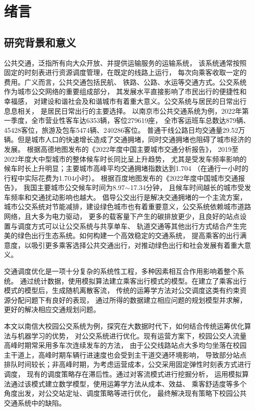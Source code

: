 \section{绪言}
\subsection{研究背景和意义}
公共交通，泛指所有向大众开放、并提供运输服务的运输系统，
该系统通常按照固定的时刻表进行资源调度管理，在既定的线路上运行，
每次向乘客收取一定的费用。广义而言，公共交通包括民航、
铁路、公路、水运等交通方式。公交系统作为城市公交网络的重要组成部分，
其发展水平直接影响了市民出行的便捷性和幸福感，
对建设和谐社会及和谐城市有着重大意义。公交系统与居民的日常出行息息相关，
是居民日常出行的主要选择。
以南京市公共交通系统为例，2022年第一季度，全市营业性客车达6353辆，客位279619座，
全市客运班车总数达879辆、45428客位，旅游及包车5474辆、240286客位。
普通干线公路日均交通量29.52万辆\cite{njjt}。但是城市人口的快速增长造成了交通拥堵，同时交通拥堵也阻碍了城市经济的发展。
根据高德地图发布的《2022年度中国主要城市交通分析报告\cite{x1}》，
2019至2022年度大中型城市的整体候车时长同比呈上升趋势，
尤其是受发车频率影响的候车时长上升明显；主要城市高峰平均交通拥堵指数达到1.704
（在通行一小时的行程中实际花费为1.704小时）。
根据百度地图发布的《2022年度中国城市交通报告\cite{bd}》，
我国主要城市公交候车时间为8.97$ \sim $17.34分钟，
且候车时间越长的城市受发车频率和交通扰动影响也越大。
倡导公交出行是解决交通拥堵的一个主流方案，
城市公交系统对节能减排，建设绿色城市也有着重要意义，公交系统依赖城市道路网络，且大多为电力驱动，
更多的载客量下产生的碳排放更少，且良好的站点设置与调度方式可以让公交系统与共享单车、
轨道交通等其他出行方式结合产生完美的绿色出行生态系统。如何构建一个高效稳定的交通系统，
提高乘客的出行满意度，以吸引更多乘客选择公共交通出行，对推动绿色出行和社会发展有着重大意义。


交通调度优化是一项十分复杂的系统性工程，多种因素相互合作用影响着整个系统。
通过统计数据，使用模拟算法建立乘客出行模式的模型。在建立了乘客出行模式的模型后，生成随机离散客流，
传统的运筹学方法对公交调度这类有约束资源分配问题下有良好的表现，
通过所得的数据建立相应问题的规划模型并求解，更好的解决相应交通规划问题。


本文以南信大校园公交系统为例，探究在大数据时代下，如何结合传统运筹优化算法与机器学习的优势，
对公交系统进行优化。现有运营方案下，校园公交人流量高峰时期常采用多车次连续发车的方法，
由于公交线路站点大多均匀坐落在校园主干道上，高峰时期车辆行进速度也会受到主干道交通环境影响，
导致部分站点排队时间较长；非高峰时期，为考虑运营成本，公交采用固定弹性时刻表方式进行调度，
现有的调度策略存在滞后性。通过对客流模式进行挖掘分析，
运用模拟算法通过该模式建立数学模型，使用运筹学方法从成本、效益、
乘客舒适度等多个角度出发，对公交站定址、调度策略等进行优化，
最终解决现有策略下校园公共交通系统中的缺陷。


